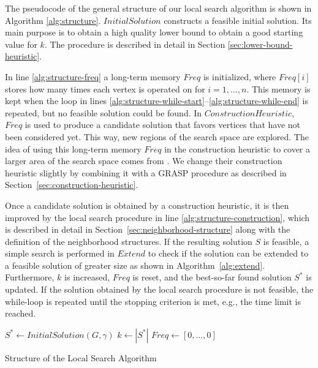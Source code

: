 \documentclass[draft,final]{vutinfth} %
\begin{document}
The pseudocode of the general structure of our local search algorithm is shown in Algorithm \ref{alg:structure}.
$\mathit{InitialSolution}$ constructs a feasible initial solution. Its main purpose is to obtain a high quality lower bound to obtain a good starting value for $k$. The procedure is described in detail in Section \ref{sec:lower-bound-heuristic}.

In line \ref{alg:structure-freq} a long-term memory $\mathit{Freq}$ is initialized, where $\mathit{Freq[i]}$ stores how many times each vertex is operated on for $i=1,\dots,n$. This memory is kept when the loop in lines \ref{alg:structure-while-start}--\ref{alg:structure-while-end} is repeated, but no feasible solution could be found. In $\mathit{ConstructionHeuristic}$, $\mathit{Freq}$ is used to produce a candidate solution that favors vertices that have not been considered yet. This way, new regions of the search space are explored. The idea of using this long-term memory $\mathit{Freq}$ in the construction heuristic to cover a larger area of the search space comes from \cite{chen_nuqclq_2021}. We change their construction heuristic slightly by combining it with a GRASP procedure as described in Section~\ref{sec:construction-heuristic}. 

Once a candidate solution is obtained by a construction heuristic, it is then improved by the local search procedure in line \ref{alg:structure-construction}, which is described in detail in Section~\ref{sec:neighborhood-structure} along with the definition of the neighborhood structures. If the resulting solution $S$ is feasible, a simple search is performed in $\mathit{Extend}$ to check if the solution can be extended to a feasible solution of greater size as shown in Algorithm~\ref{alg:extend}.
Furthermore, $k$ is increased, $\mathit{Freq}$ is reset, and the best-so-far found solution $S^*$ is updated. 
If the solution obtained by the local search procedure is not feasible, the while-loop is repeated until the stopping criterion is met, e.g., the time limit is reached. 

\begin{algorithm}
    \DontPrintSemicolon
    $S^* \gets \mathit{InitialSolution}(G, \gamma)$ \;
    $k \gets |S^*|$ \; \label{alg:structure-lower-bound}
    $\mathit{Freq} \gets [0, \dots, 0]$ \label{alg:structure-freq}  

    \caption{Structure of the Local Search Algorithm}
    \label{alg:structure}
\end{algorithm}
\end{document}
